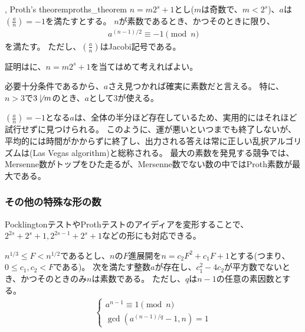 \begin{Theo}{, Proth's theorem}{proths_theorem}
$n=m2^s+1$とし($m$は奇数で、$m<2^s$)、$a$は$\left(\frac{a}{n}\right)=-1$を満たすとする。
$n$が素数であるとき、かつそのときに限り、
\begin{align*}
a^{(n-1)/2} \equiv -1 \pmod{n}
\end{align*}
を満たす。
ただし、$\left(\frac{a}{n}\right)$はJacobi記号である。
\end{Theo}

証明はに、$n=m2^s+1$を当てはめて考えればよい。


必要十分条件であるから、$a$さえ見つかれば確実に素数だと言える。
特に、$n>3$で$3\not\mid m$のとき、$a$として3が使える。


$\left(\frac{a}{n}\right)=-1$となる$a$は、全体の半分ほど存在しているため、実用的にはそれほど試行せずに見つけられる。
このように、運が悪いといつまでも終了しないが、平均的には時間がかからずに終了し、出力される答えは常に正しい乱択アルゴリズムは(Las Vegas algorithm)と総称される。
最大の素数を発見する競争では、Mersenne数がトップをひた走るが、Mersenne数でない数の中ではProth素数が最大である。

\subsubsection{その他の特殊な形の数}
PocklingtonテストやProthテストのアイディアを変形することで、$2^{2s}+2^s+1, 2^{2s-1}+2^s+1$などの形にも対応できる。

\begin{Theo}{}{}
$n^{1/3}\le F< n^{1/2}$であるとし、$n$の$F$進展開を$n=c_2F^2+c_1F+1$とする(つまり、$0\le c_1,c_2<F$である)。
次を満たす整数$a$が存在し、$c_1^2-4c_2$が平方数でないとき、かつそのときのみ$n$は素数である。
ただし、$q$は$n-1$の任意の素因数とする。
\begin{align*}
\begin{cases}
a^{n-1} \equiv 1 \pmod{n}\\
\gcd(a^{(n-1)/q}-1, n) = 1
\end{cases}
\end{align*}
\end{Theo}

